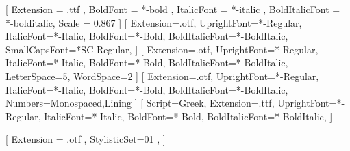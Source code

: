 % 
%
\setmainfont{serif}[
  Extension = .ttf ,
  BoldFont = *-bold ,
  ItalicFont = *-italic ,
  BoldItalicFont = *-bolditalic,
  Scale = 0.867
]
\setsansfont{AlegreyaSans}[
  Extension=.otf,
  UprightFont=*-Regular,
  ItalicFont=*-Italic,
  BoldFont=*-Bold,
  BoldItalicFont=*-BoldItalic,
  SmallCapsFont=*SC-Regular,
]
[
  Extension=.otf,
  UprightFont=*-Regular,
  ItalicFont=*-Italic,
  BoldFont=*-Bold,
  BoldItalicFont=*-BoldItalic,
  LetterSpace=5,
  WordSpace=2
]
[
  Extension=.otf,
  UprightFont=*-Regular,
  ItalicFont=*-Italic,
  BoldFont=*-Bold,
  BoldItalicFont=*-BoldItalic,
  Numbers={Monospaced,Lining}
]
[
  Script=Greek,
  Extension=.ttf,
  UprightFont=*-Regular,
  ItalicFont=*-Italic,
  BoldFont=*-Bold,
  BoldItalicFont=*-BoldItalic,
]

% 
%

\usepackage{unicode-math}

[%
  Extension = .otf ,
  StylisticSet=01 ,
]